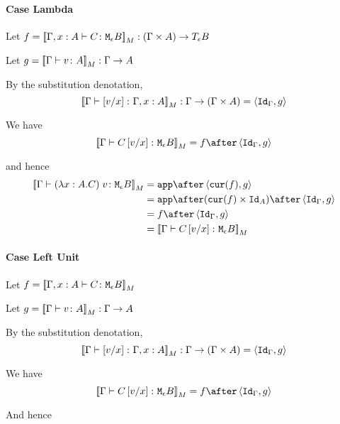 {    \paragraph{Case Lambda}
        Let $f = \deno{\typerelation{\gax}{C}{\meb}}: (\G \times A) \rightarrow\teb$

        Let $g = \deno{\gtyperelation{v}{A}}: \G \rightarrow A$

        By the substitution denotation, $$\deno{\typerelation{\G}{\ssub{x}{v}}{\gax}}: \G \rightarrow (\G \times A) = \pr{\idg}{g}$$

        We have $$\deno{\gtyperelation{C\ssub{x}{v}}{\meb}} = f \after \pr{\idg}{g}$$

        and hence
        \begin{equation}
            \begin{split}
                \deno{\gtyperelation{\apply{(\lam{x}{A}{C})}{v}}{\meb}} & = \app\after\pr{\cur{f}}{g} \\
                & = \app\after(\cur{f}\times\Id{A})\after\pr{\idg}{g}\\
                & = f \after \pr{\idg}{g} \\
                & = \deno{\gtyperelation{C\ssub{x}{v}}{\meb}}  
            \end{split}
        \end{equation}
       

    \paragraph{Case Left Unit}
    Let $f = \deno{\typerelation{\gax}{C}{\meb}}$

    Let $g = \deno{\gtyperelation{v}{A}}: \G \rightarrow A$

    By the substitution denotation, $$\deno{\typerelation{\G}{\ssub{x}{v}}{\gax}}: \G \rightarrow (\G \times A) = \pr{\idg}{g}$$

    We have $$\deno{\gtyperelation{C\ssub{x}{v}}{\meb}} = f \after \pr{\idg}{g}$$

    And hence

}
